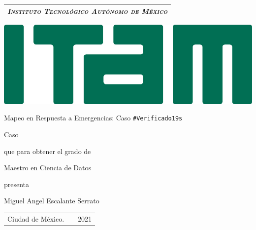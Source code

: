 \newpage

\newpage

\thispagestyle{empty}

\setcounter{page}{1}
\begin{center}
\begin{tabular}{c}
\hline
 \large \emph{\textsc{Instituto Tecnológico Autónomo de México}} \\

\hline
\end{tabular}

\vspace{10pt}

\centering
\includegraphics[width=0.8\linewidth]{img/Logo_ITAM.jpeg}

\vspace{20pt}


\Large Mapeo en Respuesta a Emergencias: Caso \texttt{\#Verificado19s}



\vspace{30pt}

\normalsize Caso

\vspace{12pt}

que para obtener el grado de

\vspace{12pt}

Maestro en Ciencia de Datos

\vspace{12pt}

presenta

\vspace{12pt}

Miguel Angel Escalante Serrato

\vspace{32pt}

\begin{tabular}{lcr}
Ciudad de México. & \hspace{80pt} & 2021
\end{tabular}

\end{center}


